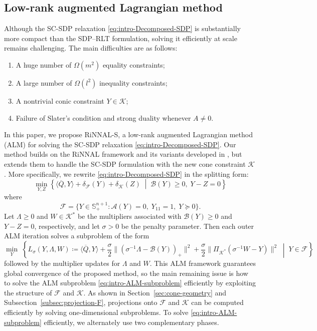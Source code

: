 \documentclass[11pt]{article}
\def\A{\mathcal{A}}
\def\B{\mathcal{B}}
\def\K{\mathcal{K}}
\def\F{\mathcal{F}}
\def\S{\mathbb{S}}
\def\bQ{\overline{Q}}
\theoremstyle{plain}
\begin{document}
\subsection{Low-rank augmented Lagrangian method}

Although the SC-SDP relaxation \eqref{eq:intro-Decomposed-SDP} is substantially more compact than the SDP--RLT formulation, solving it efficiently at scale remains challenging. The main difficulties are as follows:
\begin{enumerate}[itemsep=2pt, topsep=4pt]
    \item A huge number of $\Omega(m^2)$ equality constraints;
    \item A large number of $\Omega(l^2)$ inequality constraints;
    \item A nontrivial conic constraint $Y\in\K$;
    \item Failure of Slater’s condition and strong duality whenever $A\not=0$.
\end{enumerate}
In this paper, we propose RiNNAL-S, a low-rank augmented Lagrangian method (ALM) for solving the SC-SDP relaxation \eqref{eq:intro-Decomposed-SDP}. Our method builds on the RiNNAL framework and its variants developed in \cite{RiNNAL,RiNNALplus,RiNNALPOP}, but extends them to handle the SC-SDP formulation with the new cone constraint $\K$.
More specifically, we rewrite \eqref{eq:intro-Decomposed-SDP} in the splitting form:
\begin{equation}
\label{eq:intro-splitting}
\min_{Y,Z}\left\{
\langle \bQ,Y\rangle+\delta_{\F}(Y)+\delta_{\K}(Z)
\;\middle|\;
\B(Y)\ge 0,\; Y-Z=0
\right\}
\end{equation}
where 
\[
\F=\{Y\in\S^{n+1}_+:\A(Y)=0,\;Y_{11}=1,\;Y\succeq 0\}.
\]
Let $\Lambda\ge 0$ and $W\in\K^*$ be the multipliers associated with $\B(Y)\ge 0$ and $Y-Z=0$, respectively, and let $\sigma>0$ be the penalty parameter. Then each outer ALM iteration solves a subproblem of the form
\small
\begin{equation}
\label{eq:intro-ALM-subproblem}
\min_{Y}\; \left\{
    L_\sigma(Y,\Lambda,W)
\coloneq \langle \bQ,Y\rangle
+\frac{\sigma}{2}\|(\sigma^{-1}\Lambda-\B(Y))_+\|^2
+\frac{\sigma}{2}\|\Pi_{\K^*}(\sigma^{-1}W-Y)\|^2
\;\middle|\;
Y\in\F
\right\}
\end{equation}
\normalsize
followed by the multiplier updates for $\Lambda$ and $W$. This ALM framework guarantees global convergence of the proposed method, so the main remaining issue is how to solve the ALM subproblem \eqref{eq:intro-ALM-subproblem} efficiently by exploiting the structure of $\F$ and $\K$. As shown in Section~\ref{sec:cone-geometry} and Subsection~\ref{subsec:projection-F}, projections onto $\F$ and $\K$ can be computed efficiently by solving one-dimensional subproblems. To solve \eqref{eq:intro-ALM-subproblem} efficiently, we alternately use two complementary phases.
\end{document}
